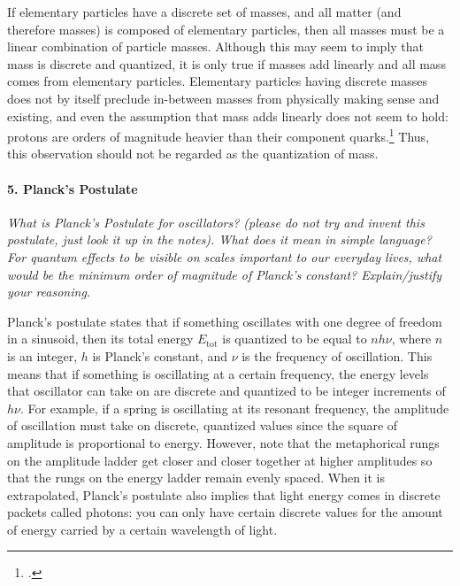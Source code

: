 \documentclass[12pt]{article}
\begin{document}
If elementary particles have a discrete set of masses, and all matter (and therefore masses) is composed of elementary particles, then all masses must be a linear combination of particle masses. Although this may seem to imply that mass is discrete and quantized, it is only true if masses add linearly and all mass comes from elementary particles. Elementary particles having discrete masses does not by itself preclude in-between masses from physically making sense and existing, and even the assumption that mass adds linearly does not seem to hold: protons are orders of magnitude heavier than their component quarks.\footcite{proton} Thus, this observation should not be regarded as the quantization of mass.

\paragraph{5. Planck's Postulate} \emph{What is Planck’s Postulate for oscillators? (please do not try and invent this postulate, just look it up in the notes). What does it mean in simple language? For quantum effects to be visible on scales important to our everyday lives, what would be the minimum order of magnitude of Planck's constant? Explain/justify your reasoning.} \medskip

Planck's postulate states that if something oscillates with one degree of freedom in a sinusoid, then its total energy $E_\text{tot}$ is quantized to be equal to $n h \nu$, where $n$ is an integer, $h$ is Planck's constant, and $\nu$ is the frequency of oscillation. This means that if something is oscillating at a certain frequency, the energy levels that oscillator can take on are discrete and quantized to be integer increments of $h \nu$. For example, if a spring is oscillating at its resonant frequency, the amplitude of oscillation must take on discrete, quantized values since the square of amplitude is proportional to energy. However, note that the metaphorical rungs on the amplitude ladder get closer and closer together at higher amplitudes so that the rungs on the energy ladder remain evenly spaced. When it is extrapolated, Planck's postulate also implies that light energy comes in discrete packets called photons: you can only have certain discrete values for the amount of energy carried by a certain wavelength of light.
\end{document}
